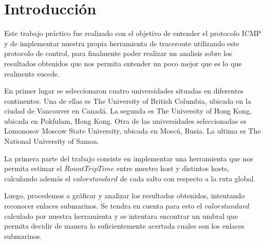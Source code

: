 \section{Introducci\'on}

Este trabajo pr\'actico fue realizado con el objetivo de entender el protocolo ICMP y de implementar nuestra propia herramienta de traceroute utilizando este protocolo de control, para finalmente poder realizar un analisis sobre los resultados obtenidos que nos permita entender un poco mejor que es lo que realmente sucede.
 
En primer lugar se seleccionaron cuatro universidades situadas en diferentes continentes. Una de ellas 
es The University of British Columbia, ubicada en la ciudad de Vancouver en Canadá. La segunda es The University of Hong Kong, ubicada en Pokfulam, Hong Kong. Otra de las universidades seleccionadas es Lomonosov Moscow State University, ubicada en Moscú, Rusia. La ultima es The National University of Samoa.

La primera parte del trabajo consiste en implementar una herramienta que nos permita estimar el $Rount Trip Time$ entre nuestro host y distintos hosts, calculando adem\'as el $valor standard$ de  cada salto con respecto a la ruta global.

Luego, procedemos a gr\'aficar y analizar los resultados obtenidos, intentando reconocer enlaces submarinos. Se tendra en cuenta para esto el $valor standard$ calculado por nuestra herramienta y se intentara encontrar un umbral que permita decidir de manera lo suficientemente acertada cuales son los enlaces submarinos.
